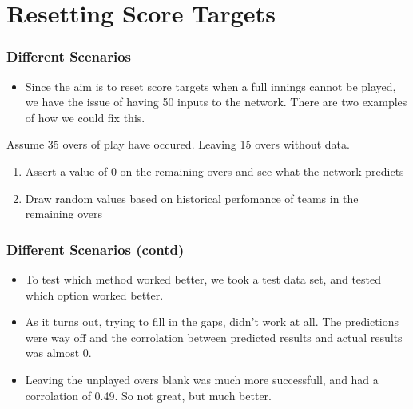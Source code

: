 \documentclass{beamer}
\begin{document}
\section{Resetting Score Targets}
\begin{frame}
    \frametitle{Different Scenarios}
\begin{itemize}
    \item Since the aim is to reset score targets when a full innings cannot be played, we have the issue 
        of having 50 inputs to the network. There are two examples of how we could fix this. 
    \pause
\end{itemize}
    \begin{example}
        Assume 35 overs of play have occured. Leaving 15 overs without data.
        \begin{enumerate}
            \item Assert a value of 0 on the remaining overs and see what the network predicts
            \item Draw random values based on historical perfomance of teams in the remaining overs
        \end{enumerate}
    \end{example}
\end{frame}

\begin{frame}
    \frametitle{Different Scenarios (contd)}
    \begin{itemize}
        \item  To test which method worked better, we took a test data set, and tested which option worked better. 
        \pause
        \item As it turns out, trying to fill in the gaps, didn't work at all. The predictions were way off and 
            the corrolation between predicted results and actual results was almost 0.
        \pause
        \item Leaving the unplayed overs blank was much more successfull, and had a corrolation of 0.49. So not great,
            but much better.
    \end{itemize}  
\end{frame}
\end{document}
